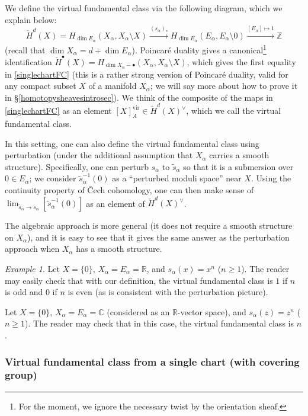\documentclass[12pt]{article}
\theoremstyle{definition}
\theoremstyle{remark}
\newtheorem{example}[theorem]{Example}
\numberwithin{equation}{subsection}
\newcommand{\CC}{\mathbb C}
\newcommand{\ZZ}{\mathbb Z}
\newcommand{\RR}{\mathbb R}
\newcommand{\cH}{\check H}
\newcommand{\vir}{\mathrm{vir}}
\begin{document}
We define the virtual fundamental class via the following diagram, which we explain below:
\begin{equation}\label{singlechartFC}
\cH^d(X)=H_{\dim E_\alpha}(X_\alpha,X_\alpha\setminus X)\xrightarrow{(s_\alpha)_\ast}H_{\dim E_\alpha}(E_\alpha,E_\alpha\setminus 0)\xrightarrow{[E_\alpha]\mapsto 1}\ZZ
\end{equation}
(recall that $\dim X_\alpha=d+\dim E_\alpha$).  Poincar\'e duality gives a canonical\footnote{For the moment, we ignore the necessary twist by the orientation sheaf.} identification $\cH^\bullet(X)=H_{\dim X_\alpha-\bullet}(X_\alpha,X_\alpha\setminus X)$, which gives the first equality in \eqref{singlechartFC} (this is a rather strong version of Poincar\'e duality, valid for any compact subset $X$ of a manifold $X_\alpha$; we will say more about how to prove it in \S\ref{homotopysheavesintrosec}).  We think of the composite of the maps in \eqref{singlechartFC} as an element $[X]_A^\vir\in\cH^d(X)^\vee$, which we call the virtual fundamental class.

In this setting, one can also define the virtual fundamental class using perturbation (under the additional assumption that $X_\alpha$ carries a smooth structure).  Specifically, one can perturb $s_\alpha$ to $\tilde s_\alpha$ so that it is a submersion over $0\in E_\alpha$; we consider $\tilde s_\alpha^{-1}(0)$ as a ``perturbed moduli space'' near $X$.  Using the continuity property of \v Cech cohomology, one can then make sense of $\lim_{\tilde s_\alpha\to s_\alpha}[\tilde s_\alpha^{-1}(0)]$ as an element of $\cH^d(X)^\vee$.

The algebraic approach is more general (it does not require a smooth structure on $X_\alpha$), and it is easy to see that it gives the same answer as the perturbation approach when $X_\alpha$ has a smooth structure.

\begin{example}
Let $X=\{0\}$, $X_\alpha=E_\alpha=\RR$, and $s_\alpha(x)=x^n$ ($n\geq 1$).  The reader may easily check that with our definition, the virtual fundamental class is $1$ if $n$ is odd and $0$ if $n$ is even (as is consistent with the perturbation picture).

Let $X=\{0\}$, $X_\alpha=E_\alpha=\CC$ (considered as an $\RR$-vector space), and $s_\alpha(z)=z^n$ ($n\geq 1$).  The reader may check that in this case, the virtual fundamental class is $n$.
\end{example}

\subsubsection{Virtual fundamental class from a single chart (with covering group)}\label{vfcsinglechartisotropy}
\end{document}
